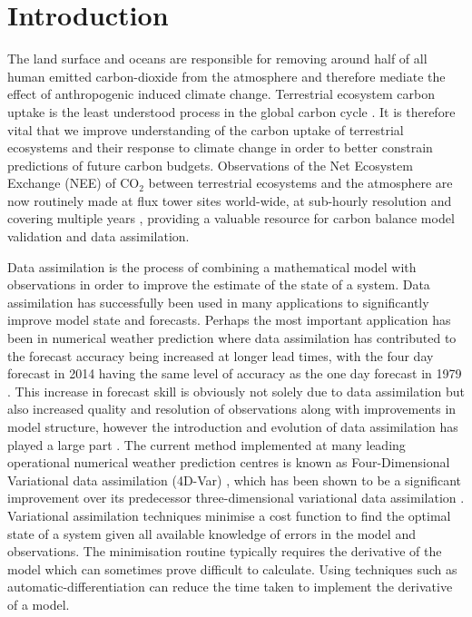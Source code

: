 \section{Introduction} \label{chap6:sec:intro}

The land surface and oceans are responsible for removing around half of all human emitted carbon-dioxide from the atmosphere and therefore mediate the effect of anthropogenic induced climate change. Terrestrial ecosystem carbon uptake is the least understood process in the global carbon cycle \citep{ciais2014carbon}. It is therefore vital that we improve understanding of the carbon uptake of terrestrial ecosystems and their response to climate change in order to better constrain predictions of future carbon budgets. Observations of the Net Ecosystem Exchange (NEE) of CO$_{2}$ between terrestrial ecosystems and the atmosphere are now routinely made at flux tower sites world-wide, at sub-hourly resolution and covering multiple years \citep{baldocchi2008turner}, providing a valuable resource for carbon balance model validation and data assimilation.

Data assimilation is the process of combining a mathematical model with observations in order to improve the estimate of the state of a system. Data assimilation has successfully been used in many applications to significantly improve model state and forecasts. Perhaps the most important application has been in numerical weather prediction where data assimilation has contributed to the forecast accuracy being increased at longer lead times, with the four day forecast in 2014 having the same level of accuracy as the one day forecast in 1979 \citep{bauer2015quiet}. This increase in forecast skill is obviously not solely due to data assimilation but also increased quality and resolution of observations along with improvements in model structure, however the introduction and evolution of data assimilation has played a large part \citep{dee2011era}. The current method implemented at many leading operational numerical weather prediction centres is known as Four-Dimensional Variational data assimilation (4D-Var) \citep{QJ:QJ2652, QJ:QJ2054}, which has been shown to be a significant improvement over its predecessor three-dimensional variational data assimilation \citep{lorenc2005does}. Variational assimilation techniques minimise a cost function to find the optimal state of a system given all available knowledge of errors in the model and observations. The minimisation routine typically requires the derivative of the model which can sometimes prove difficult to calculate. Using techniques such as automatic-differentiation \citep{renaud1997automatic} can reduce the time taken to implement the derivative of a model. 


